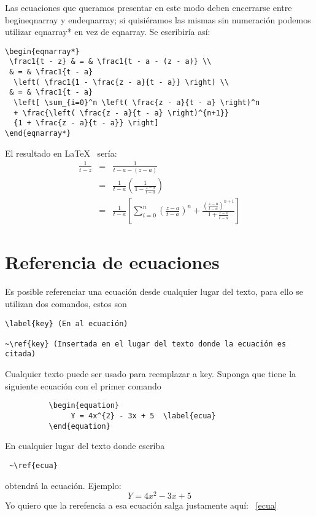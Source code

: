 \documentclass[a4paper,12pt]{article}
\begin{document}
Las ecuaciones que queramos presentar en este modo deben encerrarse entre begin{eqnarray} y end{eqnarray}; si quisiéramos 
las mismas sin numeración podemos utilizar eqnarray* en vez de eqnarray.
Se escribiría así:
\begin{verbatim}
\begin{eqnarray*}
 \frac1{t - z} & = & \frac1{t - a - (z - a)} \\
 & = & \frac1{t - a}
  \left( \frac1{1 - \frac{z - a}{t - a}} \right) \\
 & = & \frac1{t - a}
  \left[ \sum_{i=0}^n \left( \frac{z - a}{t - a} \right)^n
  + \frac{\left( \frac{z - a}{t - a} \right)^{n+1}}
  {1 + \frac{z - a}{t - a}} \right]
\end{eqnarray*}
\end{verbatim}
El resultado en \LaTeX{}~\cite{Lam:86} sería:
\begin{eqnarray*}
 \frac1{t - z} & = & \frac1{t - a - (z - a)} \\
 & = & \frac1{t - a}
  \left( \frac1{1 - \frac{z - a}{t - a}} \right) \\
 & = & \frac1{t - a}
  \left[ \sum_{i=0}^n \left( \frac{z - a}{t - a} \right)^n
  + \frac{\left( \frac{z - a}{t - a} \right)^{n+1}}
  {1 + \frac{z - a}{t - a}} \right]
\end{eqnarray*}

\section{Referencia de ecuaciones}
Es posible referenciar una ecuación desde cualquier lugar del texto, para ello se utilizan dos comandos, estos son
\begin{verbatim}
\label{key} (En al ecuación)

~\ref{key} (Insertada en el lugar del texto donde la ecuación es citada)

\end{verbatim}
Cualquier texto puede ser usado para reemplazar a key. Suponga que tiene la siguiente ecuación con el primer comando
\begin{verbatim}
          \begin{equation}
               Y = 4x^{2} - 3x + 5  \label{ecua}
          \end{equation}
\end{verbatim}
En cualquier lugar del texto donde escriba \begin{verbatim} ~\ref{ecua} \end{verbatim} obtendrá la ecuación.
Ejemplo:
\begin{equation}
               Y = 4x^{2} - 3x + 5  \label{ecua}
          \end{equation}
Yo quiero que la rerefencia a esa ecuación salga justamente aquí: ~\ref{ecua}
\end{document}
